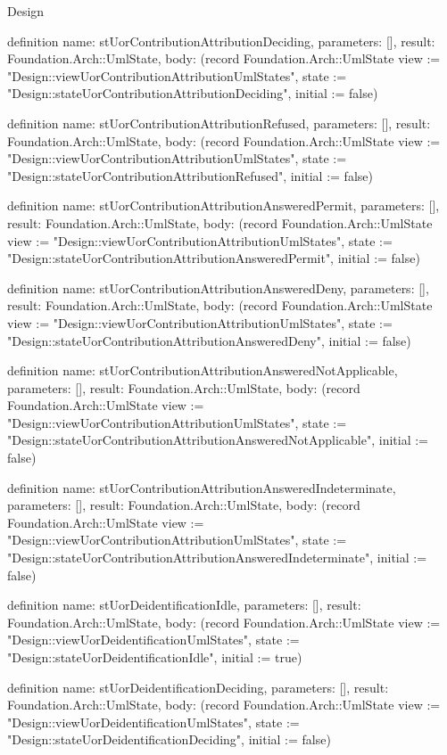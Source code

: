 \begin{lexlean}{Design}
\begin{semanticmodule}
definition{
  name: stUorContributionAttributionDeciding,
  parameters: [],
  result: Foundation.Arch::UmlState,
  body: (record Foundation.Arch::UmlState {view := "Design::viewUorContributionAttributionUmlStates", state := "Design::stateUorContributionAttributionDeciding", initial := false})
}

definition{
  name: stUorContributionAttributionRefused,
  parameters: [],
  result: Foundation.Arch::UmlState,
  body: (record Foundation.Arch::UmlState {view := "Design::viewUorContributionAttributionUmlStates", state := "Design::stateUorContributionAttributionRefused", initial := false})
}

definition{
  name: stUorContributionAttributionAnsweredPermit,
  parameters: [],
  result: Foundation.Arch::UmlState,
  body: (record Foundation.Arch::UmlState {view := "Design::viewUorContributionAttributionUmlStates", state := "Design::stateUorContributionAttributionAnsweredPermit", initial := false})
}

definition{
  name: stUorContributionAttributionAnsweredDeny,
  parameters: [],
  result: Foundation.Arch::UmlState,
  body: (record Foundation.Arch::UmlState {view := "Design::viewUorContributionAttributionUmlStates", state := "Design::stateUorContributionAttributionAnsweredDeny", initial := false})
}

definition{
  name: stUorContributionAttributionAnsweredNotApplicable,
  parameters: [],
  result: Foundation.Arch::UmlState,
  body: (record Foundation.Arch::UmlState {view := "Design::viewUorContributionAttributionUmlStates", state := "Design::stateUorContributionAttributionAnsweredNotApplicable", initial := false})
}

definition{
  name: stUorContributionAttributionAnsweredIndeterminate,
  parameters: [],
  result: Foundation.Arch::UmlState,
  body: (record Foundation.Arch::UmlState {view := "Design::viewUorContributionAttributionUmlStates", state := "Design::stateUorContributionAttributionAnsweredIndeterminate", initial := false})
}

definition{
  name: stUorDeidentificationIdle,
  parameters: [],
  result: Foundation.Arch::UmlState,
  body: (record Foundation.Arch::UmlState {view := "Design::viewUorDeidentificationUmlStates", state := "Design::stateUorDeidentificationIdle", initial := true})
}

definition{
  name: stUorDeidentificationDeciding,
  parameters: [],
  result: Foundation.Arch::UmlState,
  body: (record Foundation.Arch::UmlState {view := "Design::viewUorDeidentificationUmlStates", state := "Design::stateUorDeidentificationDeciding", initial := false})
}


\end{semanticmodule}
\end{lexlean}
